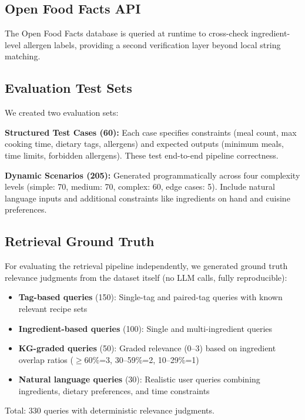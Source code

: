 \documentclass[11pt,twocolumn]{article}
\begin{document}
\subsection{Open Food Facts API}

The Open Food Facts database is queried at runtime to cross-check ingredient-level allergen labels, providing a second verification layer beyond local string matching.

\subsection{Evaluation Test Sets}

We created two evaluation sets:

\textbf{Structured Test Cases (60):} Each case specifies constraints (meal count, max cooking time, dietary tags, allergens) and expected outputs (minimum meals, time limits, forbidden allergens). These test end-to-end pipeline correctness.

\textbf{Dynamic Scenarios (205):} Generated programmatically across four complexity levels (simple: 70, medium: 70, complex: 60, edge cases: 5). Include natural language inputs and additional constraints like ingredients on hand and cuisine preferences.

\subsection{Retrieval Ground Truth}

For evaluating the retrieval pipeline independently, we generated ground truth relevance judgments from the dataset itself (no LLM calls, fully reproducible):
\begin{itemize}[nosep]
    \item \textbf{Tag-based queries} (150): Single-tag and paired-tag queries with known relevant recipe sets
    \item \textbf{Ingredient-based queries} (100): Single and multi-ingredient queries
    \item \textbf{KG-graded queries} (50): Graded relevance (0--3) based on ingredient overlap ratios ($\geq$60\%=3, 30--59\%=2, 10--29\%=1)
    \item \textbf{Natural language queries} (30): Realistic user queries combining ingredients, dietary preferences, and time constraints
\end{itemize}
Total: 330 queries with deterministic relevance judgments.

\end{document}
